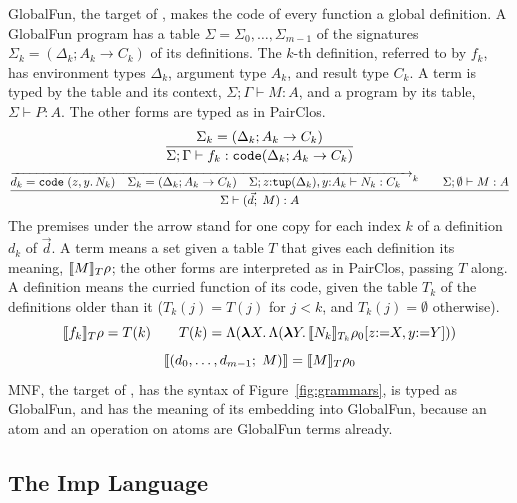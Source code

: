 GlobalFun, the target of , makes the code of every function a global definition. A GlobalFun program has a table $\Sigma = \Sigma_0, \ldots, \Sigma_{m-1}$
of the signatures $\Sigma_k = (\Delta_k; A_k \rightarrow C_k)$ of its
definitions. The $k$-th definition, referred to by $f_k$, has environment
types $\Delta_k$, argument type $A_k$, and result type $C_k$. A term is typed by the table and its context,
$\Sigma; \Gamma \vdash M : A$, and a program by its table,
$\Sigma \vdash P : A$. The other forms are typed as in PairClos.
{\small\figdefs
{}
\[
  \dfrac{\Sigma_k = (\Delta_k; A_k \rightarrow C_k)}
        {\Sigma; \Gamma \vdash f_k : \mathtt{code}(\Delta_k; A_k \rightarrow C_k)}
\]
\[
  \dfrac{\overrightarrow{d_k = \mathtt{code}\;(z, y.\,N_k) \quad
           \Sigma_k = (\Delta_k; A_k \rightarrow C_k) \quad
           \Sigma; z{:}\mathtt{tup}(\Delta_k), y{:}A_k \vdash N_k : C_k \quad}^{k}
         \qquad \Sigma; \emptyset \vdash M : A}
        {\Sigma \vdash (\vec{d};\; M) : A}
\]
}
The premises under the arrow stand for one copy for each index $k$ of a
definition $d_k$ of $\vec{d}$. A term means a set given a table $T$ that gives each definition its
meaning, $\llbracket M \rrbracket_T\rho$; the other forms are interpreted as in
PairClos, passing $T$ along. A definition means the curried function
of its code, given the table $T_k$ of the definitions older than it
($T_k(j) = T(j)$ for $j < k$, and $T_k(j) = \emptyset$ otherwise).
{\small\figdefs
{}
\[
  \llbracket f_k \rrbracket_T\rho = T(k)
  \qquad
  T(k) = \Lambda(\boldsymbol{\lambda} X.\, \Lambda(\boldsymbol{\lambda} Y.\, \llbracket N_k \rrbracket_{T_k}\rho_0[z{:=}X, y{:=}Y]))
\]
\[
  \llbracket (d_0, \ldots, d_{m-1};\; M) \rrbracket = \llbracket M \rrbracket_T\rho_0
\]
}
MNF, the target of , has the syntax of Figure~\ref{fig:grammars}, is typed as GlobalFun,
and has the meaning of its embedding into GlobalFun, because an atom and an
operation on atoms are GlobalFun terms already.

\subsection{The Imp Language}

